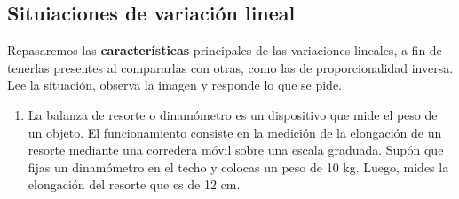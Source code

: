 \documentclass[11pt]{book}
\begin{document}
\subsection{Situiaciones de variación lineal}
Repasaremos las \textbf{características} principales de las variaciones lineales, a fin de tenerlas presentes al
compararlas con otras, como las de proporcionalidad inversa. Lee la situación, observa la imagen y responde lo que se pide.
\begin{enumerate}
  \item La balanza de resorte o dinamómetro es un dispositivo que mide el peso de un objeto.
        El funcionamiento consiste en la medición de la elongación de un resorte mediante una corredera
        móvil sobre una escala graduada. Supón que fijas un dinamómetro en el techo y colocas un peso
        de 10 kg. Luego, mides la elongación del resorte que es de 12 cm.\\
        \begin{minipage}[t]{0.15\linewidth}
          \begin{figure}[H]
            \centering

\end{figure}
\end{minipage}
\end{enumerate}
\end{document}
